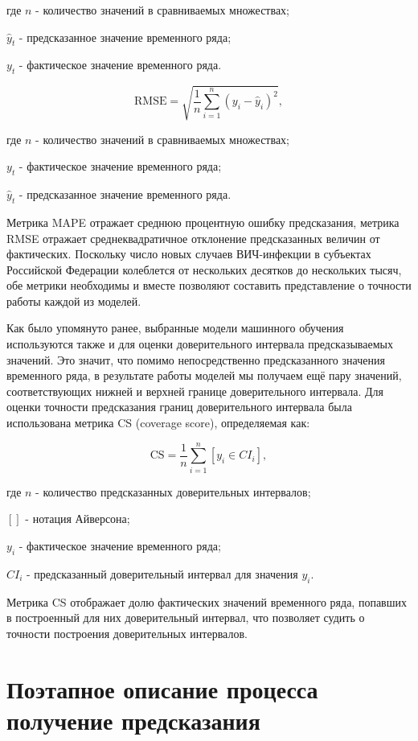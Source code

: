 где $n$ - количество значений в сравниваемых множествах;

$\hat{y}_t$ - предсказанное значение временного ряда;

$y_t$ - фактическое значение временного ряда.


\begin{equation}
	\text{RMSE} = \sqrt{\frac{1}{n} \sum_{i=1}^{n} (y_i - \hat{y}_i)^2},
\end{equation}

где $n$ - количество значений в сравниваемых множествах;

$y_t$ - фактическое значение временного ряда;

$\hat{y}_t$ - предсказанное значение временного ряда.

Метрика MAPE отражает среднюю процентную ошибку предсказания, метрика RMSE отражает среднеквадратичное отклонение предсказанных величин от фактических. Поскольку число новых случаев ВИЧ-инфекции в субъектах Российской Федерации колеблется от нескольких десятков до нескольких тысяч, обе метрики необходимы и вместе позволяют составить представление о точности работы каждой из моделей.

Как было упомянуто ранее, выбранные модели машинного обучения используются также и для оценки доверительного интервала предсказываемых значений. Это значит, что помимо непосредственно предсказанного значения временного ряда, в результате работы моделей мы получаем ещё пару значений, соответствующих нижней и верхней границе доверительного интервала. Для оценки точности предсказания границ доверительного интервала была использована метрика CS (coverage score), определяемая как:

\begin{equation}
	\text{CS} = \frac{1}{n} \sum_{i=1}^{n} [y_i \in CI_i],
\end{equation}

 где $n$ - количество предсказанных доверительных интервалов;
 
 $[ ]$ - нотация Айверсона;
 
 $y_i$ - фактическое значение временного ряда;
 
 $CI_i$ - предсказанный доверительный интервал для значения $y_i$.
 
 Метрика CS отображает долю фактических значений временного ряда, попавших в построенный для них доверительный интервал, что позволяет судить о точности построения доверительных интервалов.


\section{Поэтапное описание процесса получение предсказания}

